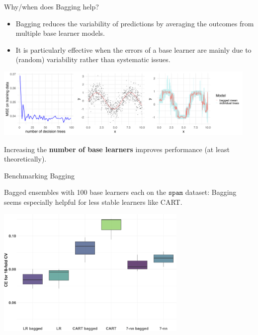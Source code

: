\documentclass[11pt,compress,t,notes=noshow, xcolor=table]{beamer}
\begin{document}
\begin{vbframe}{Why/when does Bagging help?}

\begin{itemize}
  \item Bagging reduces the variability of predictions by averaging the outcomes from multiple base learner models. %

  \item It is particularly effective when the errors of a base learner are mainly due to (random) variability rather than systematic issues.
\end{itemize}

\begin{center}
\includegraphics[width=360pt]{figure/bagging-mean.png}
\end{center}

\begin{center}
\footnotesize{Increasing the \textbf{number of base learners} improves performance (at least theoretically).}
\end{center}

\end{vbframe}

\begin{vbframe}{Benchmarking Bagging}

Bagged ensembles with 100 base learners each on the $\texttt{spam}$ dataset: Bagging seems especially helpful for less stable learners like CART.

\begin{center}
\includegraphics[width=260pt]{figure/bagging-bench.png}
\end{center}

\end{vbframe}


\endlecture
\end{document}
